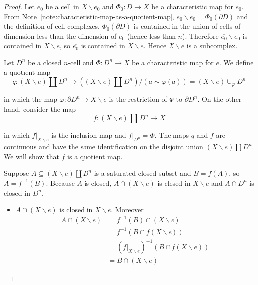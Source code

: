 \begin{proof}
	Let \( e_{0} \) be a cell in \( X\smallsetminus e_{0} \) and \( \Phi_{0}: D \to X \) be a characteristic map for \( e_{0} \). From Note~\ref{note:characteristic-map-as-a-quotient-map}, \( \overline{e_{0}}\smallsetminus e_{0} = \Phi_{0}(\partial D) \) and the definition of cell complexes, \( \Phi_{0}(\partial D) \) is contained in the union of cells of dimension less than the dimension of \( e_{0} \) (hence less than \( n \)). Therefore \( \overline{e_{0}}\smallsetminus e_{0} \) is contained in \( X \smallsetminus e \), so \( \overline{e_{0}} \) is contained in \( X \smallsetminus e \). Hence \( X \smallsetminus e \) is a subcomplex.

	Let \( D^{n} \) be a closed \( n \)-cell and \( \Phi: D^{n} \to X \) be a characteristic map for \( e \). We define a quotient map
	\[
		q: (X\smallsetminus e) \amalg D^{n} \to ((X\smallsetminus e) \amalg D^{n})/(a \sim \varphi(a)) = (X\smallsetminus e) \cup_{\varphi} D^{n}
	\]

	in which the map \( \varphi: \partial D^{n} \to X\smallsetminus e \) is the restriction of \( \Phi \) to \( \partial D^{n} \). On the other hand, consider the map
	\[
		f: (X\smallsetminus e) \amalg D^{n} \to X
	\]

	in which \( f\vert_{X\smallsetminus e} \) is the inclusion map and \( f\vert_{D^{n}} = \Phi \). The maps \( q \) and \( f \) are continuous and have the same identification on the disjoint union \( (X\smallsetminus e) \amalg D^{n} \). We will show that \( f \) is a quotient map.

	Suppose \( A \subseteq (X\smallsetminus e) \amalg D^{n} \) is a saturated closed subset and \( B = f(A) \), so \( A = f^{-1}(B) \). Because \( A \) is closed, \( A \cap (X\smallsetminus e) \) is closed in \( X\smallsetminus e \) and \( A \cap D^{n} \) is closed in \( D^{n} \).
	\begin{itemize}[leftmargin=*]
		\item \( A \cap (X\smallsetminus e) \) is closed in \( X\smallsetminus e \). Moreover
		      \begingroup
		      \allowdisplaybreaks
		      \begin{align*}
			      A \cap (X\smallsetminus e) & = f^{-1}(B) \cap (X\smallsetminus e)                               \\
			                                 & = f^{-1}(B \cap f(X\smallsetminus e))                              \\
			                                 & = {(f\vert_{X\smallsetminus e})}^{-1}(B \cap f(X\smallsetminus e)) \\
			                                 & = B \cap (X\smallsetminus e)
		      \end{align*}
		      \endgroup


\end{itemize}
\end{proof}
